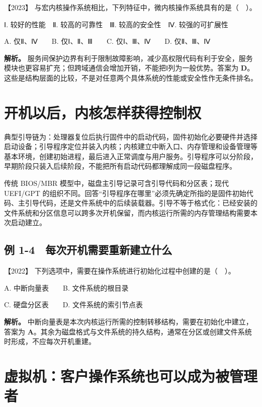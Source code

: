 \noindent{}【2023】 与宏内核操作系统相比，下列特征中，微内核操作系统具有的是（　）。

Ⅰ. 较好的性能　Ⅱ. 较高的可靠性　Ⅲ. 较高的安全性　Ⅳ. 较强的可扩展性

A. 仅Ⅱ、Ⅳ　　B. 仅Ⅰ、Ⅱ、Ⅲ　　C. 仅Ⅰ、Ⅲ、Ⅳ　　D. 仅Ⅱ、Ⅲ、Ⅳ


\textbf{解析。} 服务间保护边界有利于限制故障影响，减少高权限代码有利于安全，服务模块也更容易扩充；但跨域通信会增加开销，不能把Ⅰ列为一般优势。答案为 \textbf{D}。这些是结构层面的比较，不是对任意两个具体系统的性能或安全性作无条件排名。

\section{开机以后，内核怎样获得控制权}\label{os-1-9}

典型引导链为：处理器复位后执行固件中的启动代码，固件初始化必要硬件并选择启动设备；引导程序定位并装入内核；内核建立中断入口、内存管理和设备管理等基本环境，创建初始进程，最后进入正常调度与用户服务。引导程序可以分阶段，早期阶段只装入后续阶段，不能把所有启动代码都理解成同一段磁盘程序。

传统 BIOS/MBR 模型中，磁盘主引导记录可含引导代码和分区表；现代 UEFI/GPT 的组织不同。回答``引导程序在哪里''必须先确定所指的是固件初始代码、主引导代码，还是文件系统中的后续装载器。引导不等于格式化：已经安装的文件系统和分区信息可以跨多次开机保留，而内核运行所需的内存管理结构需要本次启动建立。

\subsection{例 1-4　每次开机需要重新建立什么}\label{os-ex1-4}

\noindent{}【2022】 下列选项中，需要在操作系统进行初始化过程中创建的是（　）。

A. 中断向量表　　B. 文件系统的根目录

C. 硬盘分区表　　D. 文件系统的索引节点表


\textbf{解析。} 中断向量表是本次内核运行所需的控制转移结构，需要在初始化中建立，答案为 \textbf{A}。其余为磁盘格式与文件系统的持久结构，通常在分区或创建文件系统时形成，不应每次开机重建。

\section{虚拟机：客户操作系统也可以成为被管理者}\label{os-1-10}

